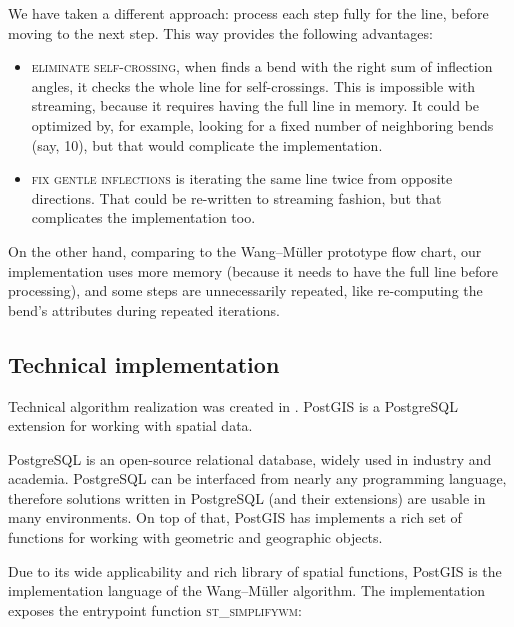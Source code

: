 \documentclass[a4paper]{article}
\newcommand{\titlecite}[1]{\citetitle{#1}\cite{#1}}
\newcommand{\WM}{Wang--M{\"u}ller}
\begin{document}
We have taken a different approach: process each step fully for the line,
before moving to the next step. This way provides the following advantages:

\begin{itemize}

    \item \textsc{eliminate self-crossing}, when finds a bend with the right
        sum of inflection angles, it checks the whole line for self-crossings.
        This is impossible with streaming, because it requires having the full
        line in memory. It could be optimized by, for example, looking for a
        fixed number of neighboring bends (say, 10), but that would complicate
        the implementation.

    \item \textsc{fix gentle inflections} is iterating the same line twice from
        opposite directions. That could be re-written to streaming fashion, but
        that complicates the implementation too.

\end{itemize}

On the other hand, comparing to the {\WM} prototype flow chart, our
implementation uses more memory (because it needs to have the full line before
processing), and some steps are unnecessarily repeated, like re-computing the
bend's attributes during repeated iterations.

\subsection{Technical implementation}
\label{sec:technical-implementation}

Technical algorithm realization was created in \titlecite{postgis311}. PostGIS
is a PostgreSQL extension for working with spatial data.

PostgreSQL is an open-source relational database, widely used in industry and
academia. PostgreSQL can be interfaced from nearly any programming language,
therefore solutions written in PostgreSQL (and their extensions) are usable in
many environments. On top of that, PostGIS has implements a rich set of
functions\cite{postgisref} for working with geometric and geographic objects.

Due to its wide applicability and rich library of spatial functions, PostGIS is
the implementation language of the {\WM} algorithm. The implementation exposes
the entrypoint function \textsc{st\_simplifywm}:
\end{document}
